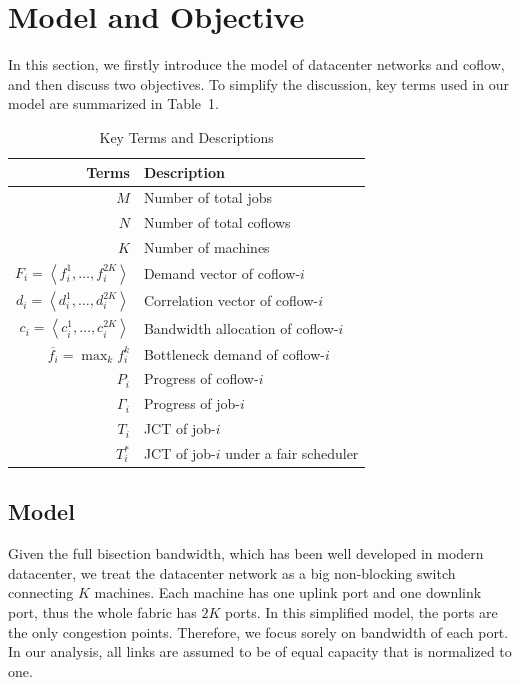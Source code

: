 \documentclass[10pt, conference, letterpaper]{IEEEtran}
\begin{document}
\section{Model and Objective}\label{model}
In this section, we firstly introduce the model of datacenter networks and coflow, and then discuss two objectives. To simplify the discussion, key terms used in our model are summarized in Table~1.
\begin{table}
\caption{Key Terms and Descriptions}
\begin{center}
\begin{tabular}{|r|l|}
\hline
Terms & Description\\
\hline
$M$ & Number of total jobs\\
\hline
$N$ & Number of total coflows\\
\hline
$K$ & Number of machines\\
\hline
$F_i = \left\langle f_i^1,\dots,f_i^{2K}\right\rangle$ & Demand vector of coflow-$i$\\
\hline
$d_i = \left\langle d_i^1,\dots,d_i^{2K}\right\rangle$ & Correlation vector of coflow-$i$\\
\hline
$c_i=\left\langle c_i^1,\dots,c_i^{2K}\right\rangle$ & Bandwidth allocation of coflow-$i$\\
\hline
$\overline{f_i}=\max_{k} f_i^k$ & Bottleneck demand of coflow-$i$\\
\hline
$P_i$ & Progress of coflow-$i$\\
\hline
$\Gamma_i$ & Progress of job-$i$\\
\hline
$T_i$ & JCT of job-$i$\\
\hline
$T_i^*$ & JCT of job-$i$ under a fair scheduler\\
\hline
\end{tabular}
\end{center}
\end{table}

\subsection{Model}
Given the full bisection bandwidth, which has been well developed in modern datacenter\cite{jupiter}, we treat the datacenter network as a big non-blocking switch connecting $K$ machines. Each machine has one uplink port and one downlink port, thus the whole fabric has $2K$ ports. In this simplified model, the ports are the only congestion points. Therefore, we focus sorely on bandwidth of each port. In our analysis, all links are assumed to be of equal capacity that is normalized to one.
\end{document}
